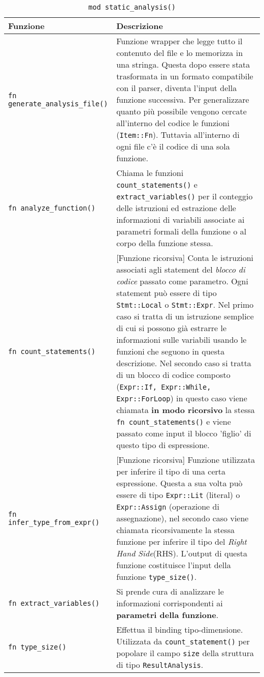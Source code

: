 \begin{table}[h]
    \centering
    \small
    \begin{tabular}{p{4.5cm} p{11cm}}
        \toprule[1.5px]
        \textbf{Funzione}&\textbf{Descrizione}\\
        \midrule
        \texttt{fn generate\_analysis\_file()}&{
            Funzione wrapper che legge tutto il contenuto del file e lo memorizza in una stringa. Questa dopo essere stata trasformata in un formato compatibile con il parser, diventa l'input della funzione successiva. Per generalizzare quanto più possibile vengono cercate all'interno del codice le funzioni (\texttt{Item::Fn}). Tuttavia all'interno di ogni file c'è il codice di una sola funzione.
        }\\
        \midrule 
        \texttt{fn analyze\_function()}&{
            Chiama le funzioni \texttt{count\_statements()} e \texttt{extract\_variables()} per il conteggio delle istruzioni ed estrazione delle informazioni di variabili associate ai parametri formali della funzione o al corpo della funzione stessa. 
        } \\
        \midrule 
        \texttt{fn count\_statements()}& {
            [Funzione ricorsiva] Conta le istruzioni associati agli statement del \textit{blocco di codice} passato come parametro. Ogni statement può essere di tipo \texttt{Stmt::Local} o \texttt{Stmt::Expr}. Nel primo caso si tratta di un istruzione semplice di cui si possono già estrarre le informazioni sulle variabili usando le funzioni che seguono in questa descrizione. Nel secondo caso si tratta di un blocco di codice composto (\texttt{Expr::If, Expr::While, Expr::ForLoop}) in questo caso viene chiamata \textbf{in modo ricorsivo} la stessa \texttt{fn count\_statements()} e viene passato come input il blocco 'figlio' di questo tipo di espressione.
        } \\
        \midrule 
        \texttt{fn infer\_type\_from\_expr()}&{
            [Funzione ricorsiva] Funzione utilizzata per inferire il tipo di una certa espressione. Questa a sua volta può essere di tipo \texttt{Expr::Lit} (literal) o \texttt{Expr::Assign} (operazione di assegnazione), nel secondo caso viene chiamata ricorsivamente la stessa funzione per inferire il tipo del \textit{Right Hand Side}(RHS). L'output di questa funzione costituisce l'input della funzione \texttt{type\_size()}.
        } \\
        \midrule 
        \texttt{fn extract\_variables()}&{
            Si prende cura di analizzare le informazioni corrispondenti ai \textbf{parametri della funzione}.
        } \\
        \midrule 
        \texttt{fn type\_size()}&{
            Effettua il binding tipo-dimensione. Utilizzata da \texttt{count\_statement()} per popolare il campo \texttt{size} della struttura di tipo \texttt{ResultAnalysis}.
        } \\
        \bottomrule[1.5px]
    \end{tabular}
    \caption{\texttt{mod static\_analysis()}}
\end{table}

